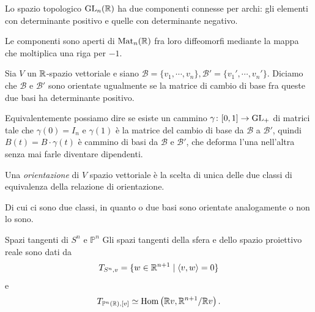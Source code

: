 \documentclass[a4paper]{article}
\begin{document}
\begin{snippettheorem}{}
    Lo spazio topologico \(\text{GL}_{n}(\mathbb{R})\)
    ha due componenti connesse per archi:
    gli elementi con determinante positivo e quelle con determinante negativo.
\end{snippettheorem}

Le componenti sono aperti di
\(\operatorname{Mat}_{n}(\mathbb{R})\) fra loro diffeomorfi
mediante la mappa che moltiplica una riga per \(-1\).

\begin{snippetcorollary}{}
    Sia \(V\) un \(\mathbb{R}\)-spazio vettoriale e siano
    \(\mathcal B = \{v_1, \cdots, v_n\}, \mathcal B' = \{v_1', \cdots, v_n'\}\).
    Diciamo che \(\mathcal B\) e \(\mathcal B'\)
    sono orientate ugualmente se la matrice di cambio di base fra queste due basi
    ha determinante positivo.
\end{snippetcorollary}

Equivalentemente possiamo dire se esiste un cammino
\(\gamma \colon [0,1] \to \text{GL}_+\)
di matrici tale che
\(\gamma(0) = I_n\)
e \(\gamma(1)\) è la matrice del cambio di base da
\(\mathcal B\) a \(\mathcal B'\), quindi
\(B(t) = B \cdot \gamma(t)\) è cammino di basi da \(\mathcal B\)
e \(\mathcal B'\), che deforma l'una nell'altra senza mai farle diventare dipendenti.

\begin{snippetdefinition}{}
    Una \emph{orientazione} di \(V\) spazio vettoriale
    è la scelta di unica delle due classi di equivalenza
    della relazione di orientazione.
\end{snippetdefinition}

Di cui ci sono due classi, in quanto o due basi sono orientate analogamente o non lo sono.



\begin{snippetproposition}{Spazi tangenti di \(S^n\) e \(\mathbb{P}^n\)}
    Gli spazi tangenti della sfera e dello spazio proiettivo reale sono dati da
    \[
        T_{S^n,v}=\{w\in\mathbb{R}^{n+1}\mid \langle v,w\rangle=0\}
    \]
    e
    \[
        T_{\mathbb{P}^n(\mathbb{R}),[v]}
        \simeq
        \operatorname{Hom}\left(\mathbb{R} v,\mathbb{R}^{n+1}/\mathbb{R} v\right).
    \]
\end{snippetproposition}
\end{document}
